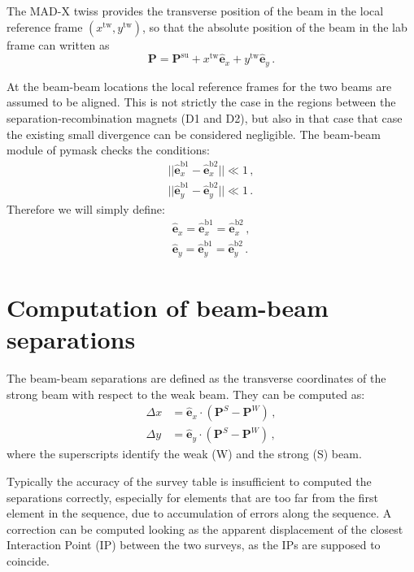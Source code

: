 The MAD-X twiss provides the transverse position of the beam in the local reference frame $(x^\text{tw}, y^\text{tw})$, so that the absolute position of the beam in the lab frame can written as
\begin{equation}
    \textbf{P} = \textbf{P}^\text{su} 
    + x^\text{tw} \hat{\textbf{e}}_x
    + y^\text{tw} \hat{\textbf{e}}_y
    \, .
\end{equation}

At the beam-beam locations the local reference frames for the two beams are assumed to be aligned. This is not strictly the case in the regions between the separation-recombination magnets (D1 and D2), but also in that case that case the existing small divergence can be considered negligible.
The beam-beam module of pymask checks the conditions:
\begin{align}
    ||\hat{\textbf{e}}_x^\text{b1} -  \hat{\textbf{e}}_x^\text{b2}|| \ll 1 \, ,\\
    ||\hat{\textbf{e}}_y^\text{b1} -  \hat{\textbf{e}}_y^\text{b2}|| \ll 1 \, .
\end{align}
Therefore we will simply define:
\begin{align}
    \hat{\textbf{e}}_x = \hat{\textbf{e}}_x^\text{b1} = \hat{\textbf{e}}_x^\text{b2} \, ,\\
    \hat{\textbf{e}}_y = \hat{\textbf{e}}_y^\text{b1} = \hat{\textbf{e}}_y^\text{b2} \, .
\end{align}

\section{Computation of beam-beam separations}
\label{sec:separ}

The beam-beam separations are defined as the transverse coordinates of the strong beam with respect to the weak beam. They can be computed as:
\begin{align}
    \Delta x &= \hat{\textbf{e}}_x \cdot \left( \textbf{P}^S -  \textbf{P}^W \right) \, ,\\
    \Delta y &= \hat{\textbf{e}}_y \cdot \left( \textbf{P}^S -  \textbf{P}^W \right) \, ,
\end{align}
where the superscripts identify the weak (W) and the strong (S) beam.

Typically the accuracy of the survey table is insufficient to computed the separations correctly, especially for elements that are too far from the first element in the sequence, due to accumulation of errors along the sequence. A correction can be computed looking as the apparent displacement of the closest Interaction Point (IP) between the two surveys, as the IPs are supposed to coincide.

